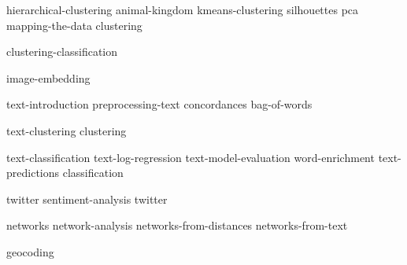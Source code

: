\documentclass[symmetric, justified, a4paper]{tufte-book}
\begin{document}

{hierarchical-clustering}
{animal-kingdom}
{kmeans-clustering}
{silhouettes}
{pca}
{mapping-the-data}
{clustering}

{clustering-classification}

{image-embedding}


{text-introduction}
{preprocessing-text}
{concordances}
{bag-of-words}

{text-clustering}
{clustering}

{text-classification}
{text-log-regression}
{text-model-evaluation}
{word-enrichment}
{text-predictions}
{classification}

{twitter}
{sentiment-analysis}
{twitter}


{networks}
{network-analysis}
{networks-from-distances}
{networks-from-text}


{geocoding}

\backmatter
\nocite{*}





\printindex
\end{document}
